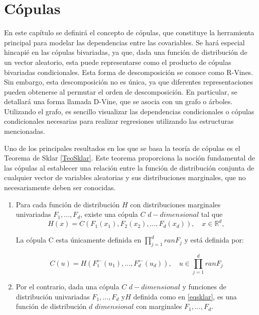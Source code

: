 
\chapter{Cópulas}\label{CapCopulas}

En este capítulo se definirá el concepto de cópulas, que constituye la herramienta principal para modelar las dependencias entre las covariables. Se hará especial hincapié en las cópulas bivariadas, ya que, dada una función de distribución de un vector aleatorio, esta puede representarse como el producto de cópulas bivariadas condicionales. Esta forma de descomposición se conoce como R-Vines. Sin embargo, esta descomposición no es única, ya que diferentes representaciones pueden obtenerse al permutar el orden de descomposición. En particular, se detallará una forma llamada D-Vine, que se asocia con un grafo o árboles. Utilizando el grafo, es sencillo visualizar las dependencias condicionales o cópulas condicionales necesarias para realizar regresiones utilizando las estructuras mencionadas.

Uno de los principales resultados en los que se basa la teoría de cópulas es el Teorema de Sklar \ref{TeoSklar}. Este teorema proporciona la noción fundamental de las cópulas al establecer una relación entre la función de distribución conjunta de cualquier vector de variables aleatorias y sus distribuciones marginales, que no necesariamente deben ser conocidas. 


\begin{teor}\label{TeoSklar}
    \begin{enumerate}
    \item Para cada función de distribución $H$ con distribuciones marginales univariadas $F_1, \dots, F_d$, existe una cópula $C$ $d-dimensional$ tal que 
    \begin{equation}\label{eqsklar}
        H(x) = C(F_1(x_1), F_2(x_2), \dots, F_d(x_d)), \quad x \in \mathbb{R}^{d},
    \end{equation}

    La cópula C esta únicamente definida en $\prod_{j = 1}^{d}ran F_j$ y está definida por:

    \begin{equation}
        C(u) = H(F_1^{\leftarrow}(u_1), \dots, F_d^{\leftarrow}(u_d)), \quad u \in \prod_{j = 1}^{d}ran F_j
    \end{equation}
    
    \item Por el contrario, dada una cópula $C$ $d-dimensional$ y funciones de distribución univariadas $F_1, \dots, F_d$ y$H$ definida como en \eqref{eqsklar}, es una función de distribución $d$ $dimensional$ con marginales $F_1, \dots, F_d$. \cite{CopulasR}
    \end{enumerate}
\end{teor}

